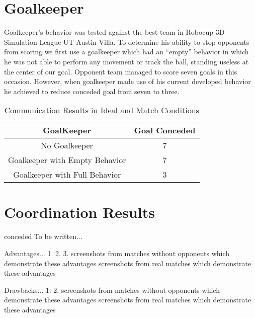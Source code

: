 \section{Goalkeeper}
Goalkeeper's behavior was tested against the best team in Robocup 3D Simulation League UT Austin Villa. To determine his ability to stop opponents from scoring we first use a goalkeeper which had an ``empty'' behavior in which he was not able to perform any movement or track the ball, standing useless at the center of our goal. Opponent team managed to score seven goals in this occasion. However, when goalkeeper made use of his current developed behavior he achieved to reduce conceded goal from seven to three.
\begin{table}
\begin{center}
    \begin{tabular}{cc}
    \textbf{GoalKeeper} 	& \textbf{Goal Conceded}\\
    \midrule
    No Goalkeeper  					            & 7\\
    Goalkeeper with Empty Behavior			& 7\\
    Goalkeeper with Full Behavior			    & 3\\
    \end{tabular}
\end{center}
\label{GoalKeeperResults}
\caption{Communication Results in Ideal and Match Conditions}
\end{table}







\section{Coordination Results}conceded
To be written...

Advantages...
1.
2.
3.
screenshots from matches without opponents which demonstrate these advantages
screenshots from real matches which demonstrate these advantages

Drawbacks...
1.
2.
screenshots from matches without opponents which demonstrate these advantages
screenshots from real matches which demonstrate these advantages

